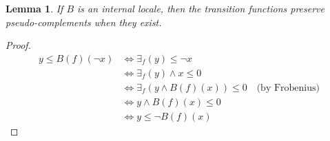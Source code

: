 \documentclass{article}
\newtheorem{Lemma}[theorem]{Lemma}
\begin{document}
 \begin{Lemma}
     If $B$ is an internal locale, then the transition functions preserve pseudo-complements when they exist.
 \end{Lemma}
 \begin{proof}
     \begin{align*}
         y\leq B(f)(\neg x) & \iff \exists_f(y)\leq \neg x\\
         & \iff \exists_f(y)\land x \leq 0\\
         & \iff \exists_f(y\land B(f)(x))\leq 0 \quad \text{(by Frobenius)}\\
         & \iff y\land B(f)(x)\leq 0\\
         & \iff y\leq \neg B(f)(x)
    \end{align*}
 \end{proof}
\end{document}
